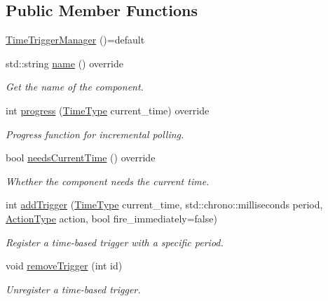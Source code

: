 \subsection*{Public Member Functions}
\begin{DoxyCompactItemize}
\item 
\hyperlink{structvt_1_1timetrigger_1_1_time_trigger_manager_a5739a97e0a8c7a19943d030a04e63a35}{Time\+Trigger\+Manager} ()=default
\item 
std\+::string \hyperlink{structvt_1_1timetrigger_1_1_time_trigger_manager_a8eba6c4f2596f9f8a6ad374ac020c8f4}{name} () override
\begin{DoxyCompactList}\small\item\em Get the name of the component. \end{DoxyCompactList}\item 
int \hyperlink{structvt_1_1timetrigger_1_1_time_trigger_manager_a15cc796e1f07dbf32c04b3fb3f3ce06c}{progress} (\hyperlink{namespacevt_a2b9f28078dc309ad0706b69ded743e69}{Time\+Type} current\+\_\+time) override
\begin{DoxyCompactList}\small\item\em Progress function for incremental polling. \end{DoxyCompactList}\item 
bool \hyperlink{structvt_1_1timetrigger_1_1_time_trigger_manager_a2e65cfcbbbb1224b08263996b0fb1eff}{needs\+Current\+Time} () override
\begin{DoxyCompactList}\small\item\em Whether the component needs the current time. \end{DoxyCompactList}\item 
int \hyperlink{structvt_1_1timetrigger_1_1_time_trigger_manager_a42729a0a83f734dad3ef6d95b5afb3d9}{add\+Trigger} (\hyperlink{namespacevt_a2b9f28078dc309ad0706b69ded743e69}{Time\+Type} current\+\_\+time, std\+::chrono\+::milliseconds period, \hyperlink{namespacevt_ae0a5a7b18cc99d7b732cb4d44f46b0f3}{Action\+Type} action, bool fire\+\_\+immediately=false)
\begin{DoxyCompactList}\small\item\em Register a time-\/based trigger with a specific period. \end{DoxyCompactList}\item 
void \hyperlink{structvt_1_1timetrigger_1_1_time_trigger_manager_ae6bdddd787aa88b714686270587e1ff5}{remove\+Trigger} (int id)
\begin{DoxyCompactList}\small\item\em Unregister a time-\/based trigger. \end{DoxyCompactList}\item 

\end{DoxyCompactItemize}
